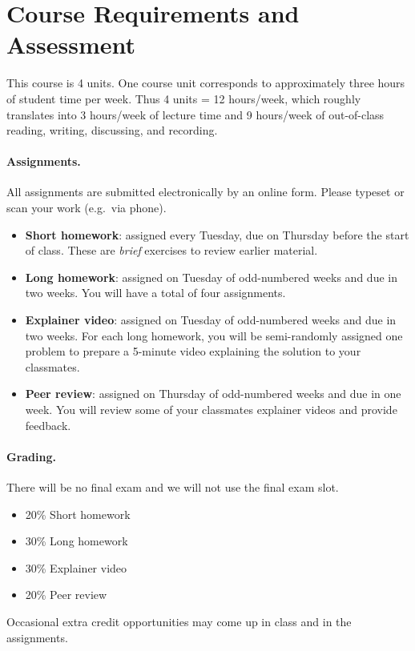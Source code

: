 \documentclass[12pt]{article}
\numberwithin{equation}{section}    %
\begin{document}
\section*{Course Requirements and Assessment}

This course is 4 units. One course unit corresponds to approximately three hours of student time per week. Thus 4 units = 12 hours/week, which roughly translates into 3 hours/week of lecture time and 9 hours/week of out-of-class reading, writing, discussing, and recording.  

\paragraph{Assignments.} All assignments are submitted electronically by an online form. Please typeset or scan your work (e.g.~via phone).
\begin{itemize}
	\item \textbf{Short homework}: assigned every Tuesday, due on Thursday before the start of class. These are \emph{brief} exercises to review earlier material.
	\item \textbf{Long homework}: assigned on Tuesday of odd-numbered weeks and due in two weeks. You will have a total of four assignments.
	\item \textbf{Explainer video}:  assigned on Tuesday of odd-numbered weeks and due in two weeks. For each long homework, you will be semi-randomly assigned one problem to prepare a 5-minute video explaining the solution to your classmates. 
	\item \textbf{Peer review}: assigned on Thursday of odd-numbered weeks and due in one week. You will review some of your classmates explainer videos and provide feedback.
\end{itemize}

\paragraph{Grading.} There will be no final exam and we will not use the final exam slot.
\begin{itemize}
\item 20\% Short homework
\item 30\% Long homework
\item 30\% Explainer video
\item 20\% Peer review
\end{itemize}
Occasional extra credit opportunities may come up in class and in the assignments.
\end{document}
